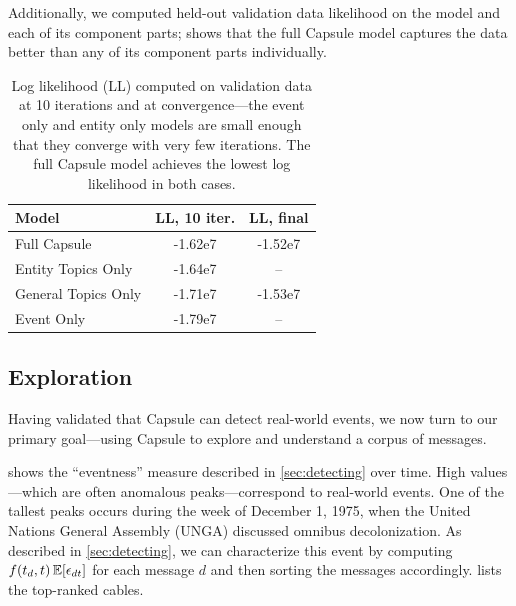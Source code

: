 Additionally, we computed held-out validation data likelihood on the model and each of its component parts;  shows that the full Capsule model captures the data better than any of its component parts individually.
\begin{table}[bt]
\centering
\begin{tabular}{l c c}
\toprule
\textbf{Model} & \textbf{LL, 10 iter.} & \textbf{LL, final} \\
\midrule
Full Capsule & -1.62e7 & -1.52e7 \\
Entity Topics Only & -1.64e7 & -- \\
General Topics Only & -1.71e7 & -1.53e7 \\
Event Only & -1.79e7 & -- \\
\bottomrule
\end{tabular}
\caption{Log likelihood (LL) computed on validation data at 10 iterations and at convergence---the event only and entity only models are small enough that they converge with very few iterations. The full Capsule model achieves the lowest log likelihood in both cases.}
\label{table:cables:ll}
\end{table}

\subsection{Exploration}

Having validated that Capsule can detect real-world events, we now
turn to our primary goal---using Capsule to explore and understand a
corpus of messages.

 shows the ``eventness'' measure described in
\cref{sec:detecting} over time. High values---which are often
anomalous peaks---correspond to real-world events. One of the tallest
peaks occurs during the week of December 1, 1975, when the United
Nations General Assembly (UNGA) discussed omnibus decolonization. As
described in \cref{sec:detecting}, we can characterize this event by
computing $f(t_d, t)\,\mathbb{E}[\epsilon_{dt}]$ for each message $d$ and then
sorting the messages accordingly.  lists the
top-ranked cables.

